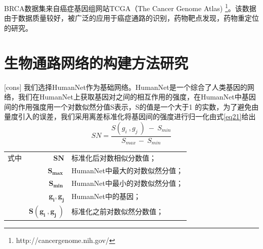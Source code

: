 BRCA数据集来自癌症基因组网站TCGA（The Cancer Genome Atlas) \footnote{http://cancergenome.nih.gov/}。该数据由于数据质量较好，被广泛的应用于癌症通路的识别，药物靶点发现，药物重定位的研究。

\section{生物通路网络的构建方法研究}[cons]
\label{cons}
我们选择HumanNet作为基础网络。HumanNet是一个综合了人类基因的网络，我们在HumanNet上获取基因对之间的相互作用的强度，在HumanNet中基因间的作用强度用一个对数似然分值S表示，S的值是一个大于1 的实数，为了避免由量度引入的误差，我们采用离差标准化将基因间的强度进行归一化由式\ref{eq21}给出
\begin{equation}\label{eq21}
SN=\frac{S( g_{i} \ ,g_{j} \ ) \ -\ S_{min}}{S_{max\ } -\ S_{min}}
\end{equation}

\begin{tabularx}{\textwidth}{@{}l@{\quad}r@{———}X@{}}
式中& $\boldsymbol{SN}$ & 标准化后对数相似分数值；\\
	& $\boldsymbol{S_{max\ }}$ &HumanNet中最大的对数似然分值；\\
	& $\boldsymbol{S_{min\ }}$ &HumanNet中最小的对数似然分值；\\
	 & $\boldsymbol{ g_{i}, g_{j}}$ &HumanNet中的基因；\\
	& $\boldsymbol{S( g_{i} \ ,g_{j} \ )}$ & 标准化之前对数似然分数值；\\
\end{tabularx}\vspace{3.15bp}


